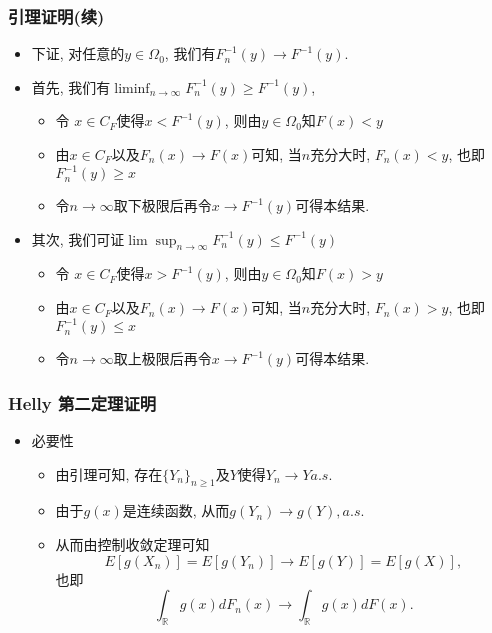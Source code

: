 \begin{frame}
	\frametitle{引理证明(续)}
	\begin{itemize}[<+-|alert@+>]

		 \item 下证, 对任意的$y \in \Omega_{0}$, 我们有$F_{n}^{-1}(y) \rightarrow F^{-1}(y)$.
		 \item 首先, 我们有${\liminf _{n \rightarrow \infty} F_{n}^{-1}(y) \geq F^{-1}(y)}$,
		 \begin{itemize}[<+-|alert@+>]
		 \item 令 $x\in C_F$使得$x<F^{-1}(y)$, 则由$y\in \Omega_0$知$F(x)<y$
		 \item 由$x\in C_F$以及$F_n(x)\rightarrow F(x)$可知, 当$n$充分大时, $F_n(x)<y$, 也即 $F_n^{-1}(y)\geq x$
		 \item 令$n\rightarrow\infty$取下极限后再令$x\rightarrow F^{-1}(y)$可得本结果.
		 \end{itemize}
		 \item 其次, 我们可证${\lim \sup _{n \rightarrow \infty} F_{n}^{-1}(y) \leq F^{-1}(y)}$
		 \begin{itemize}[<+-|alert@+>]
			\item 令 $x\in C_F$使得$x>F^{-1}(y)$, 则由$y\in \Omega_0$知$F(x)>y$
			\item 由$x\in C_F$以及$F_n(x)\rightarrow F(x)$可知, 当$n$充分大时, $F_n(x)>y$, 也即 $F_n^{-1}(y)\leq x$
			\item 令$n\rightarrow\infty$取上极限后再令$x\rightarrow F^{-1}(y)$可得本结果.
		 \end{itemize}


		\end{itemize}
\end{frame}


\begin{frame}
	\frametitle{{\rm Helly} 第二定理证明}
	\begin{itemize}[<+-|alert@+>]
	\item 必要性
	\begin{itemize}[<+-|alert@+>]
		\item 由引理可知, 存在$\{Y_n\}_{n\geq 1}$及$Y$使得$Y_n\rightarrow Y a.s.$
		\item 由于$g(x)$是连续函数, 从而$g(Y_n)\rightarrow g(Y), a.s.$
		\item 从而由控制收敛定理可知
		\[E[g(X_n)]=E[g(Y_n)]\rightarrow E[g(Y)]=E[g(X)], \]
		\pause 也即
	   \[\int_{\mathbb{R}}g(x)dF_n(x)\rightarrow\int_{\mathbb{R}}g(x)dF(x).\]
	\end{itemize}

	\end{itemize}



\end{frame}


